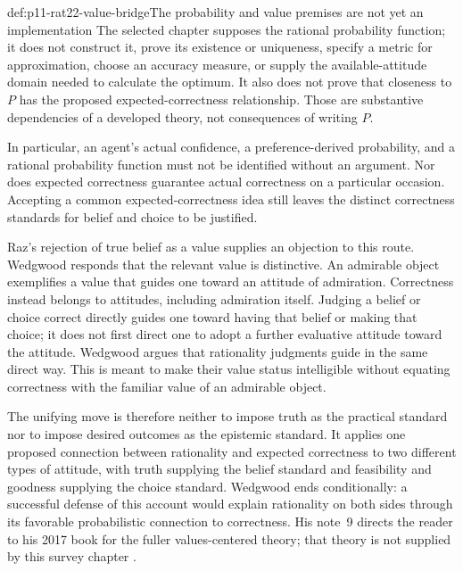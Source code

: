 \begin{hbwarning}{def:p11-rat22-value-bridge}{The probability and value premises are not yet an implementation}
The selected chapter supposes the rational probability function; it does
not construct it, prove its existence or uniqueness, specify a metric for
approximation, choose an accuracy measure, or supply the available-attitude
domain needed to calculate the optimum. It also does not prove that
closeness to \(P\) has the proposed expected-correctness relationship.
Those are substantive dependencies of a developed theory, not consequences
of writing \(P\).

In particular, an agent's actual confidence, a preference-derived
probability, and a rational probability function must not be identified
without an argument. Nor does expected correctness guarantee actual
correctness on a particular occasion. Accepting a common expected-correctness
idea still leaves the distinct correctness standards for belief and choice
to be justified.
\end{hbwarning}

Raz's rejection of true belief as a value supplies an objection to this
route. Wedgwood responds that the relevant value is distinctive. An
admirable object exemplifies a value that guides one toward an attitude of
admiration. Correctness instead belongs to attitudes, including admiration
itself. Judging a belief or choice correct directly guides one toward
having that belief or making that choice; it does not first direct one to
adopt a further evaluative attitude toward the attitude. Wedgwood argues
that rationality judgments guide in the same direct way. This is meant
to make their value status intelligible without equating correctness with
the familiar value of an admirable object.

The unifying move is therefore neither to impose truth as the practical
standard nor to impose desired outcomes as the epistemic standard. It
applies one proposed connection between rationality and expected
correctness to two different types of attitude, with truth supplying the
belief standard and feasibility and goodness supplying the choice
standard. Wedgwood ends conditionally: a successful defense of this
account would explain rationality on both sides through its favorable
probabilistic connection to correctness. His note~9 directs the reader
to his 2017 book for the fuller values-centered theory; that theory is
not supplied by this survey chapter
\parencite[pp.~143--144 and p.~144, n.~9]{RalphWedgwood2021}.

